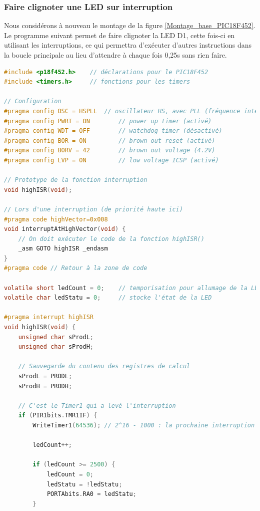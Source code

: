 \documentclass[a4paper]{article}
\begin{document}
\subsubsection{Faire clignoter une LED sur interruption}

Nous considérons à nouveau le montage de la figure \ref{Montage_base_PIC18F452}. Le programme suivant permet de faire clignoter la \ac{LED} D1, cette fois-ci en utilisant les interruptions, ce qui permettra d'exécuter d'autres instructions dans la boucle principale au lieu d'attendre à chaque fois 0,25s sans rien faire.

\begin{lstlisting}[caption=Programme faisant clignoter une \ac{LED} sur interruption, label=Programme_faisant_clignoter_une_LED_sur_interruption, language=c]
#include <p18f452.h>	// déclarations pour le PIC18F452
#include <timers.h>		// fonctions pour les timers

// Configuration
#pragma config OSC = HSPLL	// oscillateur HS, avec PLL (fréquence interne multipliée par 4)
#pragma config PWRT = ON		// power up timer (activé)
#pragma config WDT = OFF		// watchdog timer (désactivé)
#pragma config BOR = ON			// brown out reset (activé)
#pragma config BORV = 42		// brown out voltage (4.2V)
#pragma config LVP = ON			// low voltage ICSP (activé)

// Prototype de la fonction interruption
void highISR(void); 

// Lors d'une interruption (de priorité haute ici)
#pragma code highVector=0x008
void interruptAtHighVector(void) {
	// On doit exécuter le code de la fonction highISR()
	_asm GOTO highISR _endasm
}
#pragma code // Retour à la zone de code

volatile short ledCount = 0;	// temporisation pour allumage de la LED toutes les 0,25s
volatile char ledStatu = 0;		// stocke l'état de la LED

#pragma interrupt highISR
void highISR(void) {
	unsigned char sProdL;
	unsigned char sProdH;

	// Sauvegarde du contenu des registres de calcul
	sProdL = PRODL;
	sProdH = PRODH;

	// C'est le Timer1 qui a levé l'interruption
	if (PIR1bits.TMR1IF) {
		WriteTimer1(64536); // 2^16 - 1000 : la prochaine interruption a lieu dans 1000 cycles = 100us

		ledCount++;

		if (ledCount >= 2500) {
			ledCount = 0;
			ledStatu = !ledStatu;
			PORTAbits.RA0 = ledStatu;
		}


\end{lstlisting}
\end{document}
